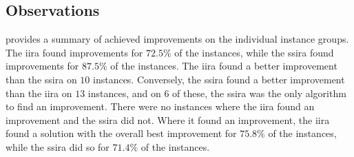 \subsection{Observations}

 provides a summary of achieved improvements on the individual instance groups.
The \ac{iira} found improvements for $72.5\%$ of the instances,
while the \ac{ssira} found improvements for $87.5\%$ of the instances.
The \ac{iira} found a better improvement than the \ac{ssira} on $10$ instances.
Conversely, the \ac{ssira} found a better improvement than the \ac{iira} on $13$ instances,
and on $6$ of these, the \ac{ssira} was the only algorithm to find an improvement.
There were no instances where the \ac{iira} found an improvement and the \ac{ssira} did not.
Where it found an improvement, the \ac{iira} found a solution
with the overall best improvement for $75.8\%$ of the instances,
while the \ac{ssira} did so for $71.4\%$ of the instances.

